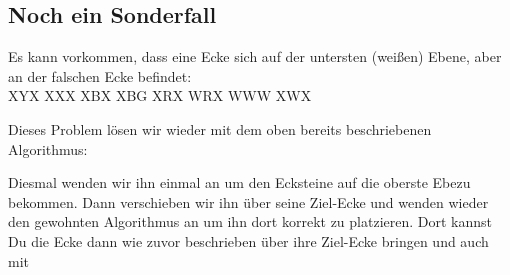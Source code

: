 \subsection{Noch ein Sonderfall}
Es kann vorkommen, dass eine Ecke sich auf der untersten (weißen) Ebene, aber an der falschen Ecke befindet:\\[1em]
\RubikCubeGreyAll%
            {X}{Y}{X}
            {X}{X}{X}%
               {X}{B}{X}
	       {X}{B}{G}%
	       {X}{R}{X}
	       {W}{R}{X}%
	      {W}{W}{W}
	      {X}{W}{X}%

Dieses Problem lösen wir wieder mit dem oben bereits beschriebenen Algorithmus:
\begin{center}
\end{center}
Diesmal wenden wir ihn einmal an um den Ecksteine auf die oberste Ebezu bekommen.
Dann verschieben wir ihn über seine Ziel-Ecke und wenden wieder den gewohnten Algorithmus an um ihn dort korrekt zu platzieren.
Dort kannst Du die Ecke dann wie zuvor beschrieben über ihre Ziel-Ecke bringen und auch mit

\pagebreak
